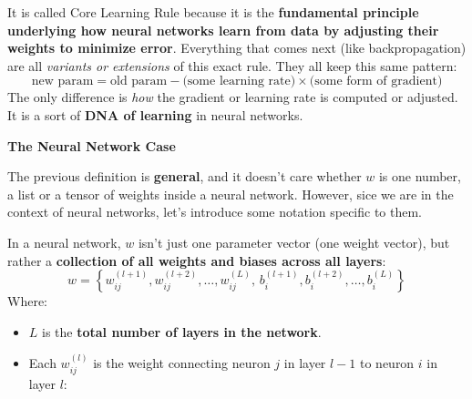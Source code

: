 \begin{definitionbox}
\begin{itemize}
    \end{itemize}
    It is called Core Learning Rule because it is the \textbf{fundamental principle underlying how neural networks learn from data by adjusting their weights to minimize error}. Everything that comes next (like backpropagation) are all \emph{variants or extensions} of this exact rule. They all keep this same pattern:
    \begin{equation*}
        \text{new param} = \text{old param} - \text{(some learning rate)} \times \text{(some form of gradient)}
    \end{equation*}
    The only difference is \emph{how} the gradient or learning rate is computed or adjusted. It is a sort of \textbf{DNA of learning} in neural networks.

    \highspace
    \begin{flushleft}
        \textcolor{Green3}{ \textbf{The Neural Network Case}}
    \end{flushleft}
    The previous definition is \textbf{general}, and it doesn't care whether $w$ is one number, a list or a tensor of weights inside a neural network. However, sice we are in the context of neural networks, let's introduce some notation specific to them.

    In a neural network, $w$ isn't just one parameter vector (one weight vector), but rather a \textbf{collection of all weights and biases across all layers}:
    \begin{equation}
        w = \left\{
            w_{ij}^{(l+1)}, w_{ij}^{(l+2)}, \ldots, w_{ij}^{(L)}, \,
            b_{i}^{(l+1)}, b_{i}^{(l+2)}, \ldots, b_{i}^{(L)}
        \right\}
    \end{equation}
    Where:
    \begin{itemize}
        \item $L$ is the \textbf{total number of layers in the network}.
        \item Each $w_{ij}^{(l)}$ is the weight connecting neuron $j$ in layer $l-1$ to neuron $i$ in layer $l$:
        \begin{center}
\end{center}
\end{itemize}
\end{definitionbox}
